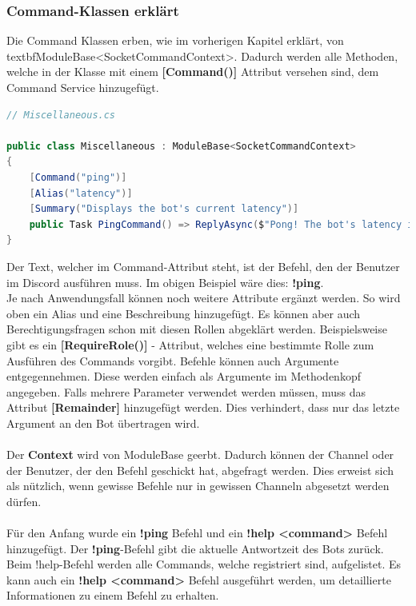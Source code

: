 \documentclass[a4paper, table]{article}
\begin{document}
\subsubsection*{Command-Klassen erklärt}
Die Command Klassen erben, wie im vorherigen Kapitel erklärt, von textbf{ModuleBase<SocketCommandContext>}. 
Dadurch werden alle Methoden, welche in der Klasse mit einem \textbf{[Command()]} Attribut versehen sind, dem Command Service hinzugefügt.

\begin{lstlisting}[language=csharp]
// Miscellaneous.cs

public class Miscellaneous : ModuleBase<SocketCommandContext>
{
    [Command("ping")]
    [Alias("latency")]
    [Summary("Displays the bot's current latency")]
    public Task PingCommand() => ReplyAsync($"Pong! The bot's latency is {Context.Client.Latency} ms.");
}
\end{lstlisting}
Der Text, welcher im Command-Attribut steht, ist der Befehl, den der Benutzer im Discord ausführen muss. 
Im obigen Beispiel wäre dies: \textbf{!ping}.\\
Je nach Anwendungsfall können noch weitere Attribute ergänzt werden. 
So wird oben ein Alias und eine Beschreibung hinzugefügt. 
Es können aber auch Berechtigungsfragen schon mit diesen Rollen abgeklärt werden. 
Beispielsweise gibt es ein \textbf{[RequireRole()]} - Attribut, welches eine bestimmte Rolle zum Ausführen des Commands vorgibt. 
Befehle können auch Argumente entgegennehmen. 
Diese werden einfach als Argumente im Methodenkopf angegeben. 
Falls mehrere Parameter verwendet werden müssen, muss das Attribut \textbf{[Remainder]} hinzugefügt werden. 
Dies verhindert, dass nur das letzte Argument an den Bot übertragen wird.\\\\
Der \textbf{Context} wird von ModuleBase geerbt. 
Dadurch können der Channel oder der Benutzer, der den Befehl geschickt hat, abgefragt werden. 
Dies erweist sich als nützlich, wenn gewisse Befehle nur in gewissen Channeln abgesetzt werden dürfen.\\\\
Für den Anfang wurde ein \textbf{!ping} Befehl und ein \textbf{!help <command>} Befehl hinzugefügt. 
Der \textbf{!ping}-Befehl gibt die aktuelle Antwortzeit des Bots zurück. 
Beim !help-Befehl werden alle Commands, welche registriert sind, aufgelistet. 
Es kann auch ein \textbf{!help <command>} Befehl ausgeführt werden, um detaillierte Informationen zu einem Befehl zu erhalten.
\end{document}
